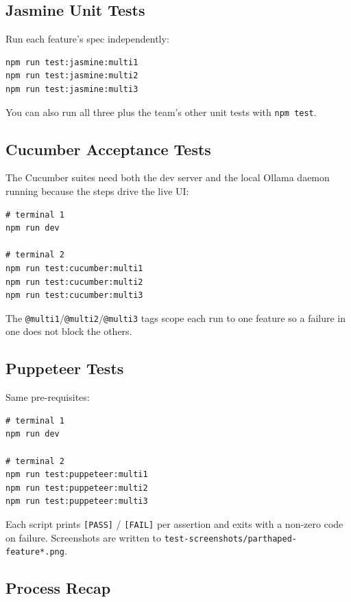 \documentclass[11pt]{article}
\begin{document}
\subsection{Jasmine Unit Tests}

Run each feature's spec independently:

\begin{lstlisting}
npm run test:jasmine:multi1
npm run test:jasmine:multi2
npm run test:jasmine:multi3
\end{lstlisting}

You can also run all three plus the team's other unit tests with
\texttt{npm test}.

\subsection{Cucumber Acceptance Tests}

The Cucumber suites need both the dev server and the local Ollama
daemon running because the steps drive the live UI:

\begin{lstlisting}
# terminal 1
npm run dev

# terminal 2
npm run test:cucumber:multi1
npm run test:cucumber:multi2
npm run test:cucumber:multi3
\end{lstlisting}

The \texttt{@multi1}/\texttt{@multi2}/\texttt{@multi3} tags scope each
run to one feature so a failure in one does not block the others.

\subsection{Puppeteer Tests}

Same pre-requisites:

\begin{lstlisting}
# terminal 1
npm run dev

# terminal 2
npm run test:puppeteer:multi1
npm run test:puppeteer:multi2
npm run test:puppeteer:multi3
\end{lstlisting}

Each script prints \texttt{[PASS]} / \texttt{[FAIL]} per assertion
and exits with a non-zero code on failure.  Screenshots are written
to \texttt{test-screenshots/parthaped-feature*.png}.

\subsection{Process Recap}
\end{document}
